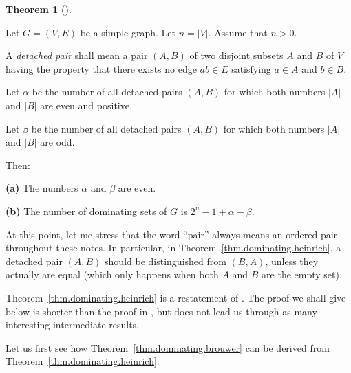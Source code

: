 \documentclass[numbers=enddot,12pt,final,onecolumn,notitlepage]{scrartcl}%
\theoremstyle{definition}
\newtheorem{theo}{Theorem}[subsection]
\newenvironment{theorem}[1][]
{\begin{theo}[#1]\begin{leftbar}}
{\end{leftbar}\end{theo}}
\newcommand{\abs}[1]{\left| #1 \right|}
\newcommand{\tup}[1]{\left( #1 \right)}
\begin{document}
\begin{theorem} \label{thm.dominating.heinrich}
Let $G = \tup{V, E}$ be a simple graph. Let $n = \abs{V}$. Assume that
$n > 0$.

A \textit{detached pair} shall mean a pair $\tup{A, B}$ of two
disjoint subsets $A$ and $B$ of $V$ having the property that
there exists no edge $ab \in E$ satisfying
$a \in A$ and $b \in B$.

Let $\alpha$ be the number of all detached pairs $\tup{A, B}$ for
which both numbers $\abs{A}$ and $\abs{B}$ are even and positive.

Let $\beta$ be the number of all detached pairs $\tup{A, B}$ for
which both numbers $\abs{A}$ and $\abs{B}$ are odd.

Then:

\textbf{(a)} The numbers $\alpha$ and $\beta$ are even.

\textbf{(b)} The number of dominating sets of $G$ is
$2^n - 1 + \alpha - \beta$.
\end{theorem}

At this point, let me stress that the word ``pair'' always means an
ordered pair throughout these notes. In particular, in
Theorem~\ref{thm.dominating.heinrich}, a detached pair $\tup{A, B}$
should be distinguished from $\tup{B, A}$, unless they actually are
equal (which only happens when both $A$ and $B$ are the empty set).

Theorem~\ref{thm.dominating.heinrich} is a restatement of
\cite[Theorem 8]{HeiTit17}. The proof we shall give below is
shorter than the proof in \cite{HeiTit17}, but does not lead us
through as many interesting intermediate results.

Let us first see how Theorem~\ref{thm.dominating.brouwer} can be
derived from Theorem~\ref{thm.dominating.heinrich}:
\end{document}
